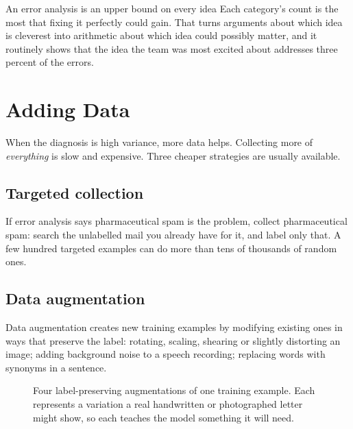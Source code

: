 \begin{keyinsight}{An error analysis is an upper bound on every idea}
Each category's count is the most that fixing it perfectly could gain. That
turns arguments about which idea is cleverest into arithmetic about which idea
could possibly matter, and it routinely shows that the idea the team was most
excited about addresses three percent of the errors.
\end{keyinsight}

\section{Adding Data}
\label{sec:adding-data}

When the diagnosis is high variance, more data helps. Collecting more of
\emph{everything} is slow and expensive. Three cheaper strategies are usually
available.

\subsection{Targeted collection}

If error analysis says pharmaceutical spam is the problem, collect pharmaceutical
spam: search the unlabelled mail you already have for it, and label only that. A
few hundred targeted examples can do more than tens of thousands of random ones.

\subsection{Data augmentation}

\begin{defbox}{Data augmentation}
 creates new training examples by modifying existing
ones in ways that preserve the label: rotating, scaling, shearing or slightly
distorting an image; adding background noise to a speech recording; replacing
words with synonyms in a sentence.
\end{defbox}

\begin{figure}[htbp]
  \centering
  \caption{Four label-preserving augmentations of one training example. Each
  represents a variation a real handwritten or photographed letter might show,
  so each teaches the model something it will need.}
  \label{fig:augment}
\end{figure}

